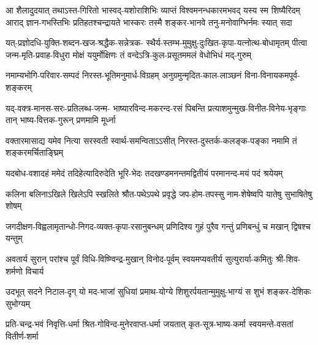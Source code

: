 
\fourlineindentedshloka
{आ शैलादुदयात् तथाऽस्त-गिरितो भास्वद्-यशोराशिभिः}
{व्याप्तं विश्वमनन्धकारमभवद् यस्य स्म शिष्यैरिदम्}
{आराद् ज्ञान-गभस्तिभिः प्रतिहतश्चन्द्रायते भास्करः}
{तस्मै शङ्कर-भानवे तनु-मनोवाग्भिर्नमः स्यात् सदा}

\fourlineindentedshloka
{यत्-प्रज्ञोदधि-युक्ति-शब्दन-खज-श्रद्धैक-सन्नेत्रक-}
{स्थैर्य-स्तम्भ-मुमुक्षु-दुःखित-कृपा-यत्नोत्थ-बोधामृतम्}
{पीत्वा जन्म-मृति-प्रवाह-विधुरा मोक्षं ययुर्मोक्षिणः}
{तं वन्देऽत्रि-कुल-प्रसूतममलं वेधोभिधं मद्-गुरुम्}


\twolineshloka
{नमाम्यभोगि-परिवार-सम्पदं निरस्त-भूतिमनुमार्ध-विग्रहम्}
{अनुग्रमुन्मृदित-काल-लाञ्छनं विना-विनायकमपूर्व-शङ्करम्}

\fourlineindentedshloka
{यद्-वक्त्र-मानस-सरः-प्रतिलब्ध-जन्म-}
{भाष्यारविन्द-मकरन्द-रसं पिबन्ति}
{प्रत्याशमुन्मुख-विनीत-विनेय-भृङ्गाः}
{तान् भाष्य-वित्तक-गुरून् प्रणमामि मूर्ध्ना}


\twolineshloka
{वक्तारमासाद्य यमेव नित्या सरस्वती स्वार्थ-समन्विताऽऽसीत्}
{निरस्त-दुस्तर्क-कलङ्क-पङ्का नमामि तं शङ्करमर्चिताङ्घ्रिम्}




\twolineshloka
{यदबोध-वशादहं ममेदं तदिहेत्यादिरुदेति भूरि-भेदः}
{तदखण्डमनन्तमद्वितीयं परमानन्द-मयं पदं श्रयेयम्}

\twolineshloka
{कलिना बलिनाऽखिले खिलेऽपि स्खलिते श्रौत-पथेऽपथे प्रवृद्धे}
{जप-होम-तपस्सु नाम-शेषेष्वपि यातेषु सुभाषितेषु शोषम्}

\twolineshloka
{जगदीक्षण-विह्वलामृतान्धो-निगद-व्यक्त-कृपा-रसानुबन्धम्}
{प्रणिदिश्य गुहं पुरैव गन्तुं प्रणिबन्धुं च मखान् द्विषश्च यन्तुम्}

\twolineshloka
{अवतार्य सुरान् परांश्च पूर्वं विधि-विष्ण्विन्द्र-मुखान् विनोद-पूर्वम्}
{स्वयमप्यवतीर्य सुत्युरार्या-कमितुः श्री-शिव-शर्मणो विचार्य}

\twolineshloka
{उदभूत् सदने निटाल-दृग् यो मद-भाजां सुधियां प्रमाथ-योग्ये}
{शिशुरर्पयतान्मुमुक्षु-भाग्यं स शुभं शङ्कर-देशिकः सुभोग्यम्}

\twolineshloka
{प्रति-चन्द्र-भवं निवृत्ति-धर्मा श्रित-गोविन्द-मुनेरवाप्त-धर्मा}
{जयतात् कृत-सूत्र-भाष्य-कर्मा स्वयमन्ते-वसतां वितीर्ण-शर्मा}

